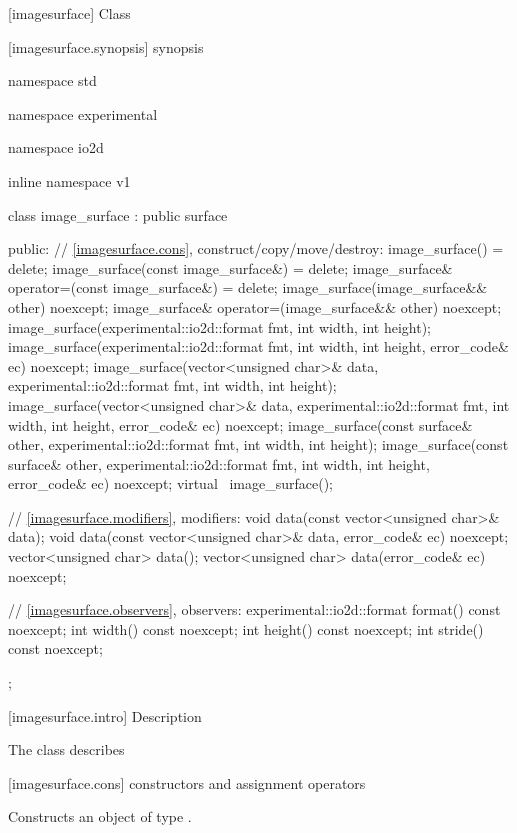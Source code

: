  [imagesurface] {Class }

 [imagesurface.synopsis] { synopsis}

\begin{codeblock}
namespace std { namespace experimental { namespace io2d { inline namespace v1 {
  class image_surface : public surface {
  public:
    // \ref{imagesurface.cons}, construct/copy/move/destroy:
    image_surface() = delete;
    image_surface(const image_surface&) = delete;
    image_surface& operator=(const image_surface&) = delete;
    image_surface(image_surface&& other) noexcept;
    image_surface& operator=(image_surface&& other) noexcept;
    image_surface(experimental::io2d::format fmt, int width, int height);
    image_surface(experimental::io2d::format fmt, int width, int height, 
      error_code& ec) noexcept;
    image_surface(vector<unsigned char>& data, experimental::io2d::format fmt,
      int width, int height);
    image_surface(vector<unsigned char>& data, experimental::io2d::format fmt,
      int width, int height, error_code& ec) noexcept;
    image_surface(const surface& other, experimental::io2d::format fmt, int width,
      int height);
    image_surface(const surface& other, experimental::io2d::format fmt, int width,
      int height, error_code& ec) noexcept;
    virtual ~image_surface();
    
    // \ref{imagesurface.modifiers}, modifiers:
    void data(const vector<unsigned char>& data);
    void data(const vector<unsigned char>& data, error_code& ec) noexcept;
    vector<unsigned char> data();
    vector<unsigned char> data(error_code& ec) noexcept;
    
    // \ref{imagesurface.observers}, observers:
    experimental::io2d::format format() const noexcept;
    int width() const noexcept;
    int height() const noexcept;
    int stride() const noexcept;
  };
} } } }
\end{codeblock}

 [imagesurface.intro] { Description}

\pnum
{}
The class  describes 

 [imagesurface.cons] { constructors and assignment operators}

\begin{itemdecl}
\end{itemdecl}
\begin{itemdescr}
	\pnum
	\effects
	Constructs an object of type .
	
	\pnum
	\postconditions
	
\end{itemdescr}

